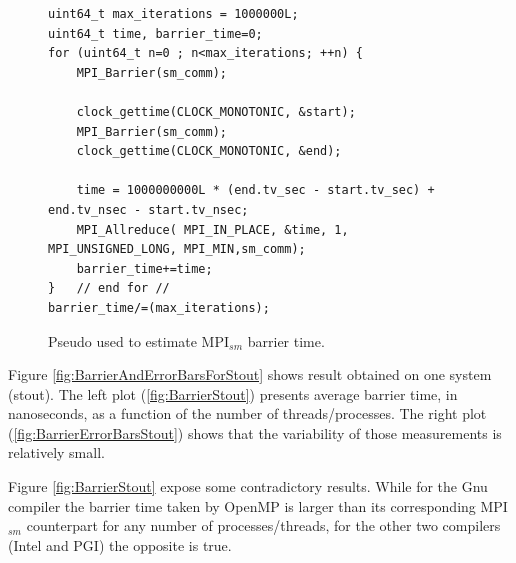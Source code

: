 \begin{figure} [t!]
\centering
\captionsetup{justification=centering, singlelinecheck=false}
\begin{lstlisting}[style=CStyle]
uint64_t max_iterations = 1000000L;
uint64_t time, barrier_time=0;
for (uint64_t n=0 ; n<max_iterations; ++n) {
    MPI_Barrier(sm_comm);
        
    clock_gettime(CLOCK_MONOTONIC, &start);
    MPI_Barrier(sm_comm);    
    clock_gettime(CLOCK_MONOTONIC, &end);
    
    time = 1000000000L * (end.tv_sec - start.tv_sec) + end.tv_nsec - start.tv_nsec;
    MPI_Allreduce( MPI_IN_PLACE, &time, 1, MPI_UNSIGNED_LONG, MPI_MIN,sm_comm);
    barrier_time+=time;
}	// end for //
barrier_time/=(max_iterations);
\end{lstlisting}    
\caption{Pseudo used to estimate MPI$_{sm}$ barrier time.}
\label{fig:PseudoCode3}
\end{figure}


\medskip

Figure \ref{fig:BarrierAndErrorBarsForStout} shows result obtained on one system (stout). The left plot (\ref{fig:BarrierStout}) presents average barrier time, in nanoseconds, as a function of the number of threads/processes. The right plot (\ref{fig:BarrierErrorBarsStout}) shows that the variability of those measurements is relatively small.

\medskip

Figure \ref{fig:BarrierStout} expose some contradictory results. While for the Gnu compiler the barrier time taken by OpenMP is larger than its corresponding MPI$_{sm}$ counterpart for any number of processes/threads, for the other two compilers (Intel and PGI) the opposite is true. 






